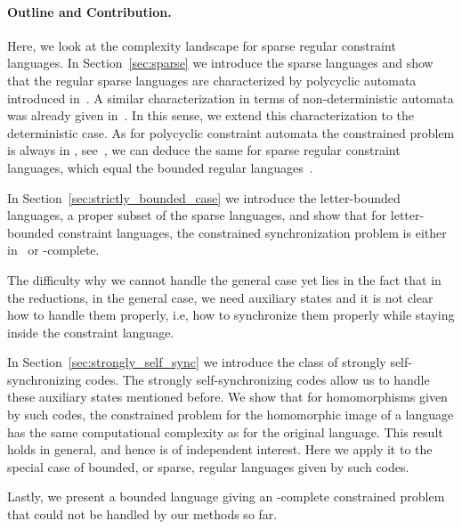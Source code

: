 \paragraph{Outline and Contribution.} 
Here, we look at the complexity landscape for sparse regular constraint
languages.
In Section~\ref{sec:sparse}
 we introduce the sparse languages and show that the regular sparse
 languages are characterized by
 polycyclic automata introduced in~\cite{DBLP:conf/ictcs/Hoffmann20}.
 A similar characterization in terms of non-deterministic
 automata was already given in~\cite[Lemma 2]{DBLP:journals/ijfcs/GawrychowskiKRS10}.
 In this sense, we extend this characterization to the deterministic
 case. As for polycyclic constraint automata the constrained
 problem is always in \NP, see~\cite[Theorem 2]{DBLP:conf/ictcs/Hoffmann20},
 we can deduce the same for sparse regular constraint languages, which
 equal the bounded regular languages~\cite{DBLP:journals/eik/LatteuxT84}.
 
 
In Section~\ref{sec:strictly_bounded_case}
we introduce the letter-bounded languages, a proper subset of the sparse languages,
and show that for letter-bounded  constraint languages, the constrained
synchronization problem is either in \PTIME\ or \NP-complete.
 
 
 The difficulty why we cannot handle the general case yet lies in the fact that
 in the reductions, %
 in the general case, we need auxiliary states and it is not clear
 how to handle them properly, i.e, 
 how to synchronize them properly while staying inside the constraint language.
 
 
 In Section~\ref{sec:strongly_self_sync}
 we introduce the class of strongly self-synchronizing
 codes. 
 The strongly self-synchronizing codes allow us to handle these auxiliary states mentioned before.
 We show that for homomorphisms given by such codes,
 the constrained problem for the homomorphic image of a language has the same computational
 complexity as for the original language.
 This result holds in general, and hence is of independent interest.
 Here we apply it to the special case
 of bounded, or sparse, regular languages given by such codes.
 
 
 Lastly, we present a bounded language giving an \NP-complete constrained
 problem that could not be handled by our methods so far.
 
 

